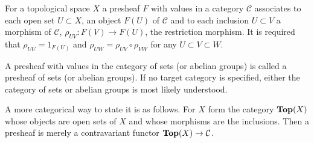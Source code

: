 \documentclass{article}
\begin{document}
For a topological space $X$ a presheaf $F$ with values in a category $\mathcal{C}$ associates to each open set $U\subset X$, an object $F(U)$ of $\mathcal{C}$ and to each inclusion $U\subset V$ a morphism of $\mathcal{C}$, $\rho_{UV} : F(V)\to F(U)$, the restriction morphism.  It is required that $\rho_{UU} = 1_{F(U)}$ and $\rho_{UW} = \rho_{UV}\circ \rho_{VW}$ for any $U\subset V\subset W$.

A presheaf with values in the category of sets (or abelian groups) is called a presheaf of sets (or abelian groups).  If no target category is specified, either the category of sets or abelian groups is most likely understood.

A more categorical way to state it is as follows.  For $X$ form the category ${\bf Top}(X)$ whose objects are open sets of $X$ and whose morphisms are the inclusions.  Then a presheaf is merely a contravariant functor ${\bf Top}(X)\to\mathcal{C}$.
\end{document}
